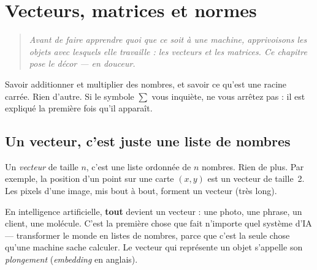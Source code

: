 \chapter{Vecteurs, matrices et normes}
\label{chap:vecteurs}

\begin{quote}\itshape
Avant de faire apprendre quoi que ce soit à une machine, apprivoisons les
objets avec lesquels elle travaille : les vecteurs et les matrices. Ce
chapitre pose le décor — en douceur.
\end{quote}

\begin{prerequis}
Savoir additionner et multiplier des nombres, et savoir ce qu'est une
racine carrée. Rien d'autre. Si le symbole $\sum$ vous inquiète, ne vous
arrêtez pas : il est expliqué la première fois qu'il apparaît.
\end{prerequis}

\section{Un vecteur, c'est juste une liste de nombres}

\begin{enclair}
Un \emph{vecteur} de taille $n$, c'est une liste ordonnée de $n$ nombres.
Rien de plus. Par exemple, la position d'un point sur une carte
$(x, y)$ est un vecteur de taille~2. Les pixels d'une image, mis bout à
bout, forment un vecteur (très long).
\end{enclair}

\begin{enia}
En intelligence artificielle, \textbf{tout} devient un vecteur : une
photo, une phrase, un client, une molécule. C'est la première chose que
fait n'importe quel système d'IA — transformer le monde en listes de
nombres, parce que c'est la seule chose qu'une machine sache calculer.
Le vecteur qui représente un objet s'appelle son \emph{plongement}
(\emph{embedding} en anglais).
\end{enia}

